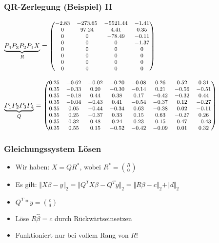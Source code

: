 \documentclass{beamer}
\begin{document}
\begin{frame}
  \frametitle{QR-Zerlegung (Beispiel) II}
  $\underbrace{P_4 P_3 P_2 P_1 X}_{R} = \footnotesize \begin{pmatrix}
    -2.83 & -273.65 & -5521.44 & -1.41 \\
    0 & 97.24 & 4.41 & 0.35 \\
    0 & 0 & -78.49 & -0.11 \\
    0 & 0 & 0 & -1.37 \\
    0 & 0 & 0 & 0 \\
    0 & 0 & 0 & 0 \\
    0 & 0 & 0 & 0 \\
    0 & 0 & 0 & 0 \\
  \end{pmatrix}$
  
  \vspace{1cm}
  \pause

  $\underbrace{P_1  P_2  P_3  P_4}_{Q} = \nobreak
  \footnotesize
  \begin{pmatrix}
    0.25 & -0.62 & -0.02 & -0.20 & -0.08 & 0.26 & 0.52 & 0.31 \\
    0.35 & -0.33 & 0.20 & -0.30 & -0.14 & 0.21 & -0.56 & -0.51 \\
    0.35 & -0.18 & 0.44 & 0.38 & 0.17 &	-0.42 &	-0.32 &	0.44 \\
    0.35 & -0.04 & -0.43 & 0.41 & -0.54 & -0.37 & 0.12 & -0.27 \\
    0.35 & 0.05 & -0.44 & -0.34 & 0.63 & -0.38 & 0.02 & -0.11 \\
    0.35 & 0.25 & -0.37 & 0.33 & 0.15 & 0.63 & -0.27 & 0.26 \\
    0.35 & 0.32 & 0.48 & 0.24 & 0.23 & 0.15 & 0.47 & -0.43 \\
    0.35 & 0.55 & 0.15 & -0.52 & -0.42 & -0.09 & 0.01 & 0.32 
  \end{pmatrix}$
\end{frame}

\begin{frame}
  \frametitle{Gleichungssystem Lösen}
  
  \begin{itemize}
  \item Wir haben: $X = QR^*$, wobei $R^* = \binom{R}{0}$
  \item Es gilt: $\Vert X\beta - y \Vert_2 = \Vert Q^T X \beta - Q^T y \Vert_2 = \Vert R \beta - c \Vert_2 + \Vert d \Vert_2$
  \item $Q^T * y = \binom{c}{d}$
  \item Löse $R \hat{\beta} = c$ durch Rückwärtseinsetzen

  \pause

  \item Funktioniert nur bei vollem Rang von $R$!
  \end{itemize}

\end{frame}
\end{document}
